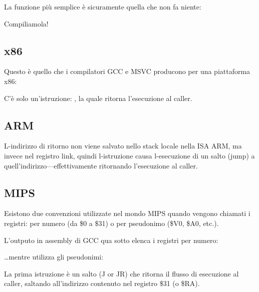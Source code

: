 \label{empty_func}

La funzione più semplice è sicuramente quella che non fa niente:



Compiliamola!

\subsection{x86}

Questo è quello che i compilatori GCC e MSVC producono per una piattaforma x86:



C'è solo un'istruzione: \RET, la quale ritorna l'esecuzione al \gls{caller}.

\subsection{ARM}



L-indirizzo di ritorno non viene salvato nello stack locale nella \ac{ISA} ARM, ma invece nel registro link,
quindi l-istruzione  causa l-esecuzione di un salto (jump) a quell'indirizzo---effettivamente ritornando l'esecuzione
al \gls{caller}.

\subsection{MIPS}

Esistono due convenzioni utilizzate nel mondo MIPS quando vengono chiamati i registri:
per numero (da \$0 a \$31) o per pseudonimo (\$V0, \$A0, etc.).

L'outputo in assembly di GCC qua sotto elenca i registri per numero:



\dots mentre \IDA utilizza gli pseudonimi:



La prima istruzione è un salto (J or JR) che ritorna il flusso di esecuzione al \gls{caller},
saltando all'indirizzo contenuto nel registro \$31 (o \$RA).

